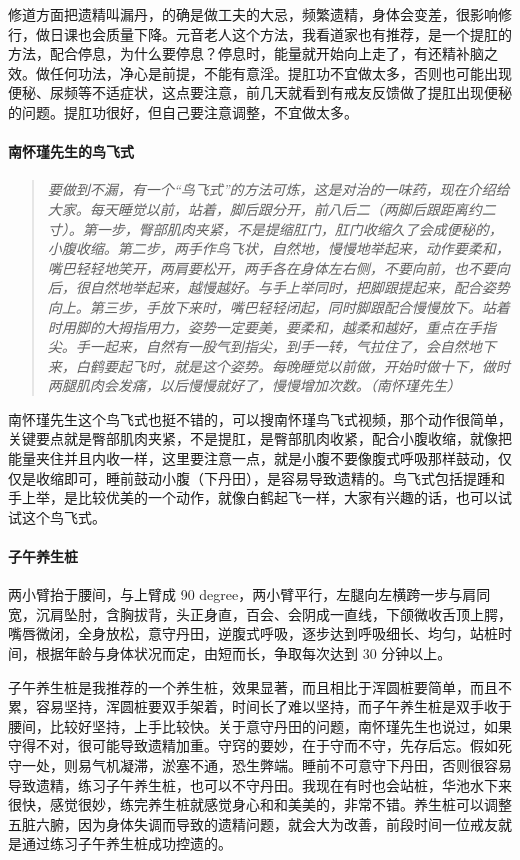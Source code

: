 修道方面把遗精叫漏丹，的确是做工夫的大忌，频繁遗精，身体会变差，很影响修行，做日课也会质量下降。元音老人这个方法，我看道家也有推荐，是一个提肛的方法，配合停息，为什么要停息？停息时，能量就开始向上走了，有还精补脑之效。做任何功法，净心是前提，不能有意淫。提肛功不宜做太多，否则也可能出现便秘、尿频等不适症状，这点要注意，前几天就看到有戒友反馈做了提肛出现便秘的问题。提肛功很好，但自己要注意调整，不宜做太多。

\paragraph{南怀瑾先生的鸟飞式}

\begin{quote}\it
    要做到不漏，有一个“鸟飞式”的方法可炼，这是对治的一味药，现在介绍给大家。每天睡觉以前，站着，脚后跟分开，前八后二（两脚后跟距离约二寸）。第一步，臀部肌肉夹紧，不是提缩肛门，肛门收缩久了会成便秘的，小腹收缩。第二步，两手作鸟飞状，自然地，慢慢地举起来，动作要柔和，嘴巴轻轻地笑开，两肩要松开，两手各在身体左右侧，不要向前，也不要向后，很自然地举起来，越慢越好。与手上举同时，把脚跟提起来，配合姿势向上。第三步，手放下来时，嘴巴轻轻闭起，同时脚跟配合慢慢放下。站着时用脚的大拇指用力，姿势一定要美，要柔和，越柔和越好，重点在手指尖。手一起来，自然有一股气到指尖，到手一转，气拉住了，会自然地下来，白鹤要起飞时，就是这个姿势。每晚睡觉以前做，开始时做十下，做时两腿肌肉会发痛，以后慢慢就好了，慢慢增加次数。（南怀瑾先生）
\end{quote}

南怀瑾先生这个鸟飞式也挺不错的，可以搜南怀瑾鸟飞式视频，那个动作很简单，关键要点就是臀部肌肉夹紧，不是提肛，是臀部肌肉收紧，配合小腹收缩，就像把能量夹住并且内收一样，这里要注意一点，就是小腹不要像腹式呼吸那样鼓动，仅仅是收缩即可，睡前鼓动小腹（下丹田），是容易导致遗精的。鸟飞式包括提踵和手上举，是比较优美的一个动作，就像白鹤起飞一样，大家有兴趣的话，也可以试试这个鸟飞式。

\paragraph{子午养生桩}

两小臂抬于腰间，与上臂成 90 \unit{degree}，两小臂平行，左腿向左横跨一步与肩同宽，沉肩坠肘，含胸拔背，头正身直，百会、会阴成一直线，下颌微收舌顶上腭，嘴唇微闭，全身放松，意守丹田，逆腹式呼吸，逐步达到呼吸细长、均匀，站桩时间，根据年龄与身体状况而定，由短而长，争取每次达到 30 分钟以上。

子午养生桩是我推荐的一个养生桩，效果显著，而且相比于浑圆桩要简单，而且不累，容易坚持，浑圆桩要双手架着，时间长了难以坚持，而子午养生桩是双手收于腰间，比较好坚持，上手比较快。关于意守丹田的问题，南怀瑾先生也说过，如果守得不对，很可能导致遗精加重。守窍的要妙，在于守而不守，先存后忘。假如死守一处，则易气机凝滞，淤塞不通，恐生弊端。睡前不可意守下丹田，否则很容易导致遗精，练习子午养生桩，也可以不守丹田。我现在有时也会站桩，华池水下来很快，感觉很妙，练完养生桩就感觉身心和和美美的，非常不错。养生桩可以调整五脏六腑，因为身体失调而导致的遗精问题，就会大为改善，前段时间一位戒友就是通过练习子午养生桩成功控遗的。

